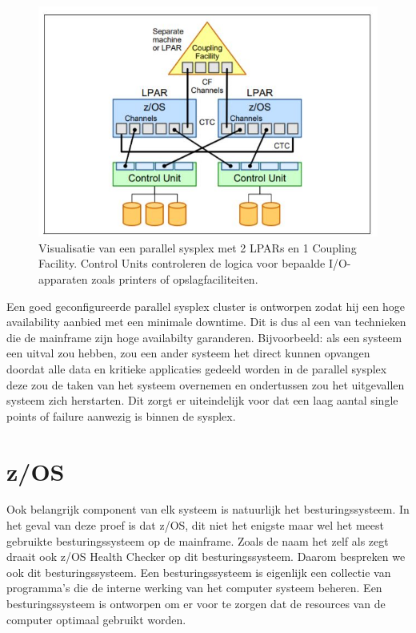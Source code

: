 \begin{figure}[h]
	\centering
	\includegraphics{img/ParallelSysplex}
	\caption[Visualisatie van een Parallel Sysplex]{Visualisatie van een parallel sysplex met 2 LPARs en 1 Coupling Facility. Control Units controleren de logica voor bepaalde I/O-apparaten zoals printers of opslagfaciliteiten.}
	\label{fig:parallelsysplex}
\end{figure}

Een goed geconfigureerde parallel sysplex cluster is ontworpen zodat hij een hoge availability aanbied met een minimale downtime. Dit is dus al een van technieken die de mainframe zijn hoge availabilty garanderen. Bijvoorbeeld: als een systeem een uitval zou hebben, zou een ander systeem het direct kunnen opvangen doordat alle data en kritieke applicaties gedeeld worden in de parallel sysplex deze zou de taken van het systeem overnemen en ondertussen zou het uitgevallen systeem zich herstarten. Dit zorgt er uiteindelijk voor dat een laag aantal single points of failure aanwezig is binnen de sysplex. \cite{Ebbers2011}

\section{z/OS}
\label{subsec:z/OS}

Ook belangrijk component van elk systeem is natuurlijk het besturingssysteem. In het geval van deze proef is dat z/OS, dit niet het enigste maar wel het meest gebruikte besturingssysteem op de mainframe. Zoals de naam het zelf als zegt draait ook z/OS Health Checker op dit besturingssysteem. Daarom bespreken we ook dit besturingssysteem. Een besturingssysteem is eigenlijk een collectie van programma's die de interne werking van het computer systeem beheren. Een besturingssysteem is ontworpen om er voor te zorgen dat de resources van de computer optimaal gebruikt worden.

